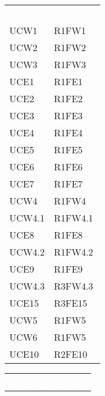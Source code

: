 \begin{table}[!htbp]
\renewcommand{\arraystretch}{1.5}
\begin{tabular}{ m{}<{\centering}  m{}<{\centering} }
	\rowcolor{darkblue}
	\textcolor{white}{\textbf{Fonte}} &\textcolor{white}{\textbf{Requisiti}}\\ 

	UCW1 & R1FW1\\	
	 
	UCW2 & R1FW2\\	

	UCW3 & R1FW3\\	
	 
	UCE1 & R1FE1\\	
	 
	UCE2 & R1FE2\\	
	 
	UCE3 & R1FE3\\	

	UCE4 & R1FE4\\	
	
	UCE5 & R1FE5\\
	 
	UCE6 & R1FE6\\	 
	 
	UCE7 & R1FE7\\	

	UCW4 & R1FW4\\ 
	 
	UCW4.1 & R1FW4.1\\	
	 
	UCE8 & R1FE8 \\	
	 
	UCW4.2 & R1FW4.2\\		 

	UCE9 & R1FE9\\		
	 
	UCW4.3 & R3FW4.3 \\				
	 
	UCE15 & R3FE15\\			
	  	 	 	
	UCW5 & R1FW5\\		
	 
	UCW6 & R1FW5 \\
	
	UCE10 & R2FE10 \\

\end{tabular}
\begin{tabular}{ m{}<{\centering}  m{}<{\centering} }
	\rowcolor{darkblue}
	\textcolor{white}{\textbf{Fonte}} &\textcolor{white}{\textbf{Requisiti}}\\ 


\end{tabular}
\end{table}
